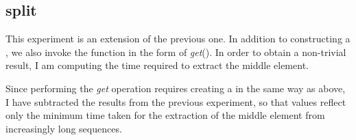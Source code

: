 \documentclass[12pt,twoside,notitlepage]{report}
\begin{document}
\subsection{split}

This experiment is an extension of the previous one. In addition to constructing a , we also invoke the  function in the form of \textit{get}(\AgdaFunction{\_!\_}). In order to obtain a non-trivial result, I am computing the time required to extract the middle element.

Since performing the \textit{get} operation requires creating a  in the same way as above, I have subtracted the results from the previous experiment, so that values reflect only the minimum time taken for the extraction of the middle element from increasingly long sequences.
\end{document}
